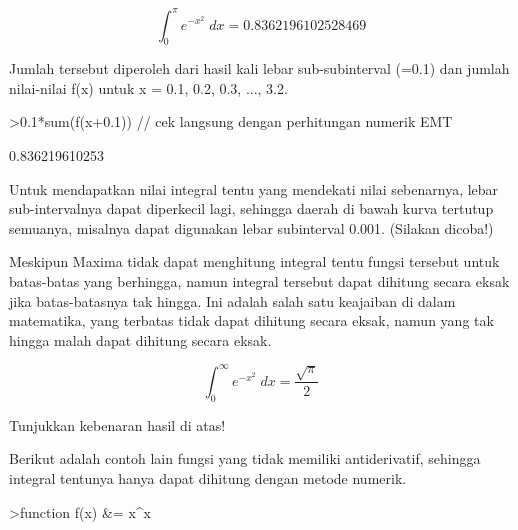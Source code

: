 \documentclass[12pt,arial,letterpaper]{book}
\begin{document}
\begin{eulercomment}
\begin{eulercomment}
\begin{eulercomment}
\begin{eulercomment}
\begin{eulercomment}
\begin{eulercomment}
\begin{eulercomment}
\begin{eulercomment}
\begin{eulercomment}
\begin{eulercomment}
\begin{eulercomment}
\begin{eulercomment}
\begin{eulercomment}
\begin{eulercomment}
\begin{eulercomment}
\begin{eulercomment}
\begin{eulercomment}
\begin{eulercomment}
\begin{eulercomment}
\begin{eulercomment}
\begin{eulercomment}
\begin{eulercomment}
\begin{eulercomment}
\end{eulercomment}
\begin{eulerformula}
\[
\int_{0}^{\pi}{e^ {- x^2 }\;dx}=0.8362196102528469
\]
\end{eulerformula}
\begin{eulercomment}
Jumlah tersebut diperoleh dari hasil kali lebar sub-subinterval (=0.1)
dan jumlah nilai-nilai f(x) untuk x = 0.1, 0.2, 0.3, ..., 3.2.
\end{eulercomment}
\begin{eulerprompt}
>0.1*sum(f(x+0.1)) // cek langsung dengan perhitungan numerik EMT
\end{eulerprompt}
\begin{euleroutput}
  0.836219610253
\end{euleroutput}
\begin{eulercomment}
Untuk mendapatkan nilai integral tentu yang mendekati nilai sebenarnya, lebar
sub-intervalnya dapat diperkecil lagi, sehingga daerah di bawah kurva tertutup
semuanya, misalnya dapat digunakan lebar subinterval 0.001. (Silakan dicoba!)

Meskipun Maxima tidak dapat menghitung integral tentu fungsi tersebut untuk
batas-batas yang berhingga, namun integral tersebut dapat dihitung secara eksak jika
batas-batasnya tak hingga. Ini adalah salah satu keajaiban di dalam matematika, yang
terbatas tidak dapat dihitung secara eksak, namun yang tak hingga malah dapat
dihitung secara eksak.
\end{eulercomment}
\begin{eulerformula}
\[
\int_{0}^{\infty }{e^ {- x^2 }\;dx}=\frac{\sqrt{\pi}}{2}
\]
\end{eulerformula}
\begin{eulercomment}
Tunjukkan kebenaran hasil di atas!

Berikut adalah contoh lain fungsi yang tidak memiliki antiderivatif, sehingga integral tentunya hanya
dapat dihitung dengan metode numerik.
\end{eulercomment}
\begin{eulerprompt}
>function f(x) &= x^x
\end{eulerprompt}
\begin{euleroutput}
  

\end{euleroutput}
\end{eulercomment}
\end{eulercomment}
\end{eulercomment}
\end{eulercomment}
\end{eulercomment}
\end{eulercomment}
\end{eulercomment}
\end{eulercomment}
\end{eulercomment}
\end{eulercomment}
\end{eulercomment}
\end{eulercomment}
\end{eulercomment}
\end{eulercomment}
\end{eulercomment}
\end{eulercomment}
\end{eulercomment}
\end{eulercomment}
\end{eulercomment}
\end{eulercomment}
\end{eulercomment}
\end{eulercomment}
\end{document}

